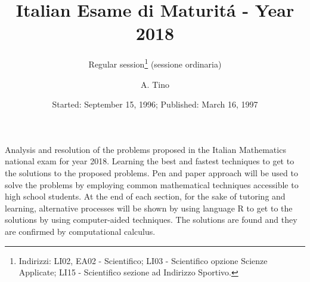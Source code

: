 \documentclass{layout}
\begin{document}
 


   \title{Italian Esame di Maturit\'a - Year 2018}

   \subtitle{Regular session\thanks{
                       Indirizzi: LI02, EA02 - Scientifico; LI03 - Scientifico opzione Scienze Applicate;
                       LI15 - Scientifico sezione ad Indirizzo Sportivo.} 
               (sessione ordinaria)}

   \author{A. Tino%
          }


   \date{Started: September 15, 1996; Published: March 16, 1997}

 
  \abstract
   {Analysis and resolution of the problems proposed in the Italian Mathematics national exam for year 2018.}
   {Learning the best and fastest techniques to get to the solutions to the proposed problems.}
   {Pen and paper approach will be used to solve the problems by employing common mathematical 
    techniques accessible to high school students. At the end of each section, for
    the sake of tutoring and learning, alternative processes will be shown by using language R to
    get to the solutions by using computer-aided techniques.}
   {The solutions are found and they are confirmed by computational calculus.}
   {}

   \maketitle
\end{document}
